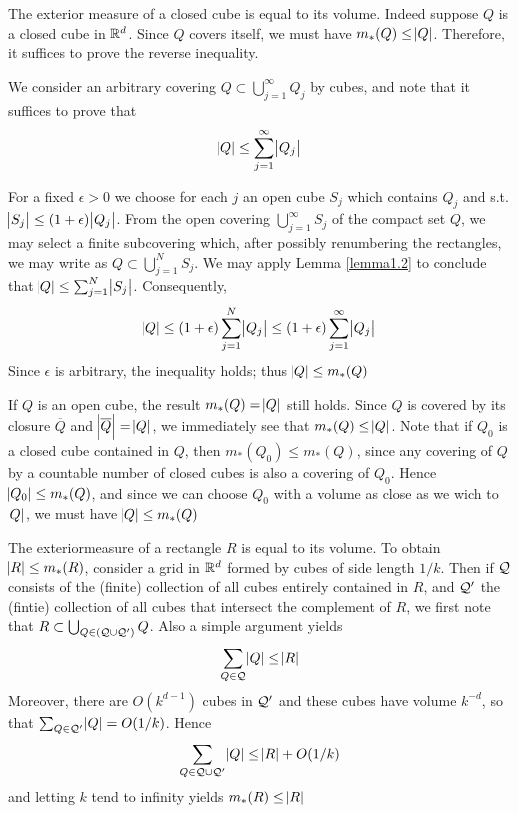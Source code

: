 \documentclass[11pt]{article}
\begin{document}
\begin{examplle}[]
The exterior measure of a closed cube is equal to its volume. Indeed suppose
\(Q\) is a closed cube in \(\mathbb{R}^d\). Since \(Q\) covers itself, we must have
\(m_*(Q)\le\abs{Q}\). Therefore, it suffices to prove the reverse inequality.

We consider an arbitrary covering \(Q\subset\bigcup_{j=1}^\infty Q_j\) by
cubes, and note that it suffices to prove that
\begin{equation*}
\abs{Q}\le \displaystyle\sum_{j=1}^\infty\abs{Q_j}
\end{equation*}

For a fixed \(\epsilon>0\) we choose for each \(j\) an open cube \(S_j\) which
contains \(Q_j\) and s.t. \(\abs{S_j}\le(1+\epsilon)\abs{Q_j}\). From the open
covering \(\bigcup_{j=1}^\infty S_j\) of the compact set \(Q\), we may select a
finite subcovering which, after possibly renumbering the rectangles, we may
write as \(Q\subset\bigcup_{j=1}^NS_j\). We may apply Lemma \ref{lemma1.2} to
conclude that \(\abs{Q}\le\sum_{j=1}^N\abs{S_j}\). Consequently,
\begin{equation*}
\abs{Q}\le(1+\epsilon)\displaystyle\sum_{j=1}^N\abs{Q_j}\le(1+\epsilon)
\displaystyle\sum_{j=1}^\infty\abs{Q_j}
\end{equation*}
Since \(\epsilon\) is arbitrary, the inequality holds; thus \(\abs{Q}\le m_*(Q)\)
\end{examplle}

\begin{examplle}[]
If \(Q\) is an open cube, the result \(m_*(Q)=\abs{Q}\) still holds. Since \(Q\) is
covered by its closure \(\overline{Q}\) and \(\abs{\overline{Q}}=\abs{Q}\), we
immediately see that \(m_*(Q)\le\abs{Q}\). Note that if \(Q_0\) is a closed cube
contained in \(Q\), then \(m_*(Q_0)\le m_*(Q)\), since any covering of \(Q\) by a
countable number of closed cubes is also a covering of \(Q_0\). Hence
\(\abs{Q_0}\le m_*(Q)\), and since we can choose \(Q_0\) with a volume as close
as we wich to \(\abs{Q}\), we must have \(\abs{Q}\le m_*(Q)\)
\end{examplle}

\begin{examplle}[]
The exteriormeasure of a rectangle \(R\) is equal to its volume. To obtain
\(\abs{R}\le m_*(R)\), consider a grid in \(\mathbb{R}^d\) formed by cubes of side length
\(1/k\). Then if \(\mathcal{Q}\) consists of the (finite) collection of all cubes entirely
contained in \(R\), and \(\mathcal{Q}'\) the (fintie) collection of all cubes that
intersect the complement of \(R\), we first note that
\(R\subset\bigcup_{Q\in(\mathcal{Q}\cup\mathcal{Q}')}Q\). Also a simple argument yields
\begin{equation*}
\displaystyle\sum_{Q\in\mathcal{Q}}\abs{Q}\le\abs{R}
\end{equation*}
Moreover, there are \(O(k^{d-1})\) cubes in \(\mathcal{Q}'\) and these cubes have
volume \(k^{-d}\), so that \(\sum_{Q\in\mathcal{Q}'}\abs{Q}=O(1/k)\). Hence
\begin{equation*}
\displaystyle\sum_{Q\in\mathcal{Q}\cup\mathcal{Q}'}\abs{Q}\le\abs{R}+O(1/k)
\end{equation*}
and letting \(k\) tend to infinity yields \(m_*(R)\le\abs{R}\)
\end{examplle}
\end{document}
